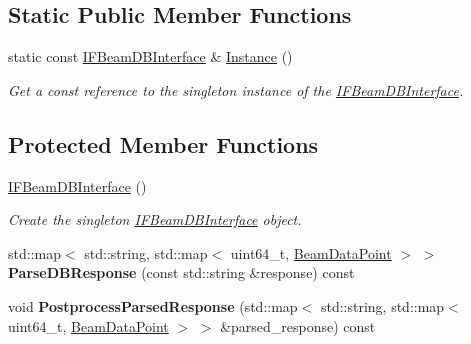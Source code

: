 \subsection*{Static Public Member Functions}
\begin{DoxyCompactItemize}
\item 
\hypertarget{classIFBeamDBInterface_a677ed1a3b7dbfc70ffb0688078ae5fb0}{
static const \hyperlink{classIFBeamDBInterface}{IFBeamDBInterface} \& \hyperlink{classIFBeamDBInterface_a677ed1a3b7dbfc70ffb0688078ae5fb0}{Instance} ()}
\label{classIFBeamDBInterface_a677ed1a3b7dbfc70ffb0688078ae5fb0}

\begin{DoxyCompactList}\small\item\em Get a const reference to the singleton instance of the \hyperlink{classIFBeamDBInterface}{IFBeamDBInterface}. \item\end{DoxyCompactList}\end{DoxyCompactItemize}
\subsection*{Protected Member Functions}
\begin{DoxyCompactItemize}
\item 
\hypertarget{classIFBeamDBInterface_af5275e528b9b43d4c5dacd0a8a3ca62b}{
\hyperlink{classIFBeamDBInterface_af5275e528b9b43d4c5dacd0a8a3ca62b}{IFBeamDBInterface} ()}
\label{classIFBeamDBInterface_af5275e528b9b43d4c5dacd0a8a3ca62b}

\begin{DoxyCompactList}\small\item\em Create the singleton \hyperlink{classIFBeamDBInterface}{IFBeamDBInterface} object. \item\end{DoxyCompactList}\item 
\hypertarget{classIFBeamDBInterface_a950bec54fb41eaf48471a8a1eab8ab71}{
std::map$<$ std::string, std::map$<$ uint64\_\-t, \hyperlink{structBeamDataPoint}{BeamDataPoint} $>$ $>$ {\bfseries ParseDBResponse} (const std::string \&response) const }
\label{classIFBeamDBInterface_a950bec54fb41eaf48471a8a1eab8ab71}

\item 
\hypertarget{classIFBeamDBInterface_a2d7b151e8b21fe5f7d255d442d37e321}{
void {\bfseries PostprocessParsedResponse} (std::map$<$ std::string, std::map$<$ uint64\_\-t, \hyperlink{structBeamDataPoint}{BeamDataPoint} $>$ $>$ \&parsed\_\-response) const }
\label{classIFBeamDBInterface_a2d7b151e8b21fe5f7d255d442d37e321}

\end{DoxyCompactItemize}
